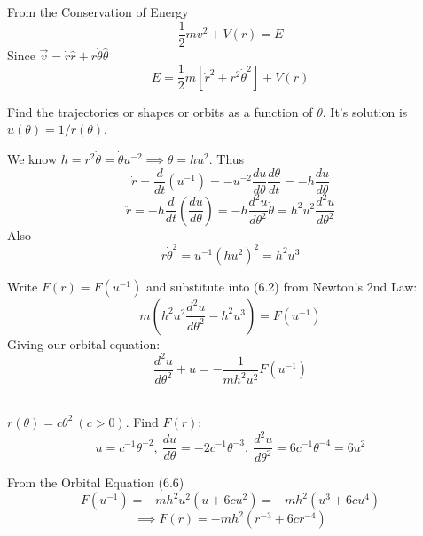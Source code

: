 From the Conservation of Energy
\[\frac{1}{2}mv^2 + V(r) = E\]
Since $\vec{v} = \dot{r}\hat{r} + r\dot{\theta}\hat{\theta}$
\begin{equation}\boxed{E = \frac{1}{2}m[\dot{r}^2 + r^2\dot{\theta}^2] + V(r)}\end{equation}
\pagebreak


Find the trajectories or shapes or orbits as a function of $\theta$. It's solution is $u(\theta) = 1/r(\theta)$. 


We know $h = r^2\dot{\theta} = \dot{\theta}u^{-2} \implies \dot{\theta} = hu^2$. Thus
\[\dot{r} = \frac{d}{dt}(u^{-1}) = -u^{-2}\frac{du}{d\theta}\frac{d\theta}{dt} = -h\frac{du}{d\theta}\]
\[\ddot{r} = -h\frac{d}{dt}\left(\frac{du}{d\theta}\right) = -h\frac{d^2u}{d\theta^2}\dot{\theta} = h^2u^2\frac{d^2u}{d\theta^2}\]
Also 
\[r\dot{\theta}^2 = u^{-1}(hu^2)^2 = h^2u^3\]


Write $F(r) = F(u^{-1})$ and substitute into (6.2) from Newton's 2nd Law:
\[m(h^2u^2\frac{d^2u}{d\theta^2} - h^2u^3) = F(u^{-1})\]
Giving our orbital equation:
\begin{equation} \boxed{\frac{d^2u}{d\theta^2} + u = -\frac{1}{mh^2u^2}F(u^{-1})} \end{equation}~

\begin{example}
	$r(\theta) = c\theta^2 ~(c > 0)$. Find $F(r)$:
	\[u = c^{-1}\theta^{-2},~\dfrac{du}{d\theta} = -2c^{-1}\theta^{-3},~\dfrac{d^2u}{d\theta^2} = 6c^{-1}\theta^{-4} = 6u^2\]
	
	From the Orbital Equation (6.6)
	\[F(u^{-1}) = -mh^2u^2(u + 6cu^2) = -mh^2(u^3 + 6cu^4)\]
	\[\implies F(r) = -mh^2(r^{-3} + 6cr^{-4})\] 
\end{example}




